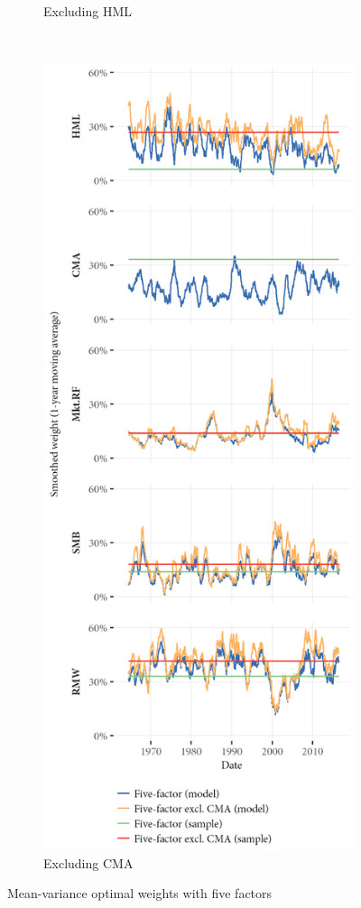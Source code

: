 \begin{figure}[htbp]
\begin{subfigure}{0.45\textwidth}
    \caption{Excluding HML}
  \end{subfigure}
  ~
  \begin{subfigure}{0.45\textwidth}
    \includegraphics[width=\textwidth]{graphics/weights/main_Weights_MV_5F_EXCL_CMA_5F.png}
    \caption{Excluding CMA}
  \end{subfigure}  
  \caption{Mean-variance optimal weights with five factors}
  \label{fig:mv_optimal_5}


\end{figure}
